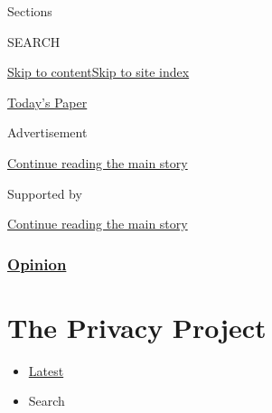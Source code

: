 Sections

SEARCH

\protect\hyperlink{site-content}{Skip to
content}\protect\hyperlink{site-index}{Skip to site index}

\href{https://myaccount.nytimes.com/auth/login?response_type=cookie\&client_id=vi}{}

\href{https://www.nytimes.com/section/todayspaper}{Today's Paper}

Advertisement

\protect\hyperlink{after-top}{Continue reading the main story}

Supported by

\protect\hyperlink{after-sponsor}{Continue reading the main story}

\hypertarget{opinion}{%
\subsubsection{\texorpdfstring{\href{/section/opinion}{Opinion}}{Opinion}}\label{opinion}}

\hypertarget{the-privacy-project}{%
\section{The Privacy Project}\label{the-privacy-project}}

\begin{itemize}
\tightlist
\item
  \protect\hyperlink{stream-panel}{Latest}
\item
  Search
\end{itemize}

